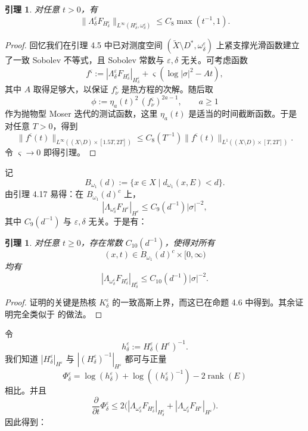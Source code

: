\documentclass[12pt,a4paper]{article}
\newtheorem{lemma}[theorem]{引理}
\newcommand{\rank}{\operatorname{rank}}
\begin{document}
\begin{lemma}
对任意 \(t>0\)，有
\[
\|\Lambda^\varepsilon_\delta F_{H^\varepsilon_\delta}\|_{L^\infty(H^\varepsilon_\delta,\omega^\varepsilon_\delta)}
\le
C_8\max(t^{-1},1).
\]
\end{lemma}

\begin{proof}
回忆我们在引理 4.5 中已对测度空间 \((\widetilde X\setminus D^*,\omega^\varepsilon_\delta)\) 上紧支撑光滑函数建立了一致 Sobolev 不等式，且 Sobolev 常数与 \(\varepsilon,\delta\) 无关。可考虑函数
\[
f^\varsigma:=|\Lambda^\varepsilon_\delta F_{H^\varepsilon_\delta}|_{H^\varepsilon_\delta}
+\varsigma(\log|\sigma|^2-At),
\]
其中 \(A\) 取得足够大，以保证 \(f^\varsigma_\nu\) 是热方程的次解。随后取
\[
\phi:=\eta_a(t)^2\,(f^\varsigma_\nu)^{2a-1},\qquad a\ge 1
\]
作为抛物型 Moser 迭代的测试函数，这里 \(\eta_a(t)\) 是适当的时间截断函数。于是对任意 \(T>0\)，得到
\[
\|f^\varsigma(t)\|_{L^\infty((X\setminus D)\times [1.5T,2T])}
\le
C_8(T^{-1})
\|f^\varsigma(t)\|_{L^1((X\setminus D)\times [T,2T])}.
\]
令 \(\varsigma\to 0\) 即得引理。
\end{proof}

记
\[
B_{\omega_1}(d):=\{x\in X\mid d_{\omega_1}(x,E)<d\}.
\]
由引理 4.17 易得：在 \(B_{\omega_1}(d)^c\) 上，
\[
|\Lambda_{\omega^\varepsilon_\delta}F_{H^\varepsilon}|_{H^\varepsilon}
\le C_9(d^{-1})|\sigma|^{-2},
\]
其中 \(C_9(d^{-1})\) 与 \(\varepsilon,\delta\) 无关。于是有：

\begin{lemma}
对任意 \(t\ge 0\)，存在常数 \(C_{10}(d^{-1})\)，使得对所有
\[
(x,t)\in B_{\omega_1}(d)^c\times [0,\infty)
\]
均有
\[
|\Lambda_{\omega^\varepsilon_\delta}F_{H^\varepsilon_\delta}|_{H^\varepsilon_\delta}
\le
C_{10}(d^{-1})|\sigma|^{-2}.
\]
\end{lemma}

\begin{proof}
证明的关键是热核 \(K^\varepsilon_\delta\) 的一致高斯上界，而这已在命题 4.6 中得到。其余证明完全类似于 \cite[Lemma 2.2]{LiZhangZhang} 的做法。
\end{proof}

令
\[
h^\varepsilon_\delta:=H^\varepsilon_\delta (H^\varepsilon)^{-1}.
\]
我们知道 \(|H^\varepsilon_\delta|_{H^\varepsilon}\) 与 \(|(H^\varepsilon_\delta)^{-1}|_{H^\varepsilon}\) 都可与正量
\[
\Phi^\varepsilon_\delta
=
\log(h^\varepsilon_\delta)+\log((h^\varepsilon_\delta)^{-1})-2\rank(E)
\]
相比。并且
\[
\frac{\partial}{\partial t}\Phi^\varepsilon_\delta
\le
2\bigl(
|\Lambda_{\omega^\varepsilon_\delta}F_{H^\varepsilon_\delta}|_{H^\varepsilon_\delta}
+
|\Lambda_{\omega^\varepsilon_\delta}F_{H^\varepsilon}|_{H^\varepsilon}
\bigr). \tag{24}
\]
因此得到：
\end{document}
